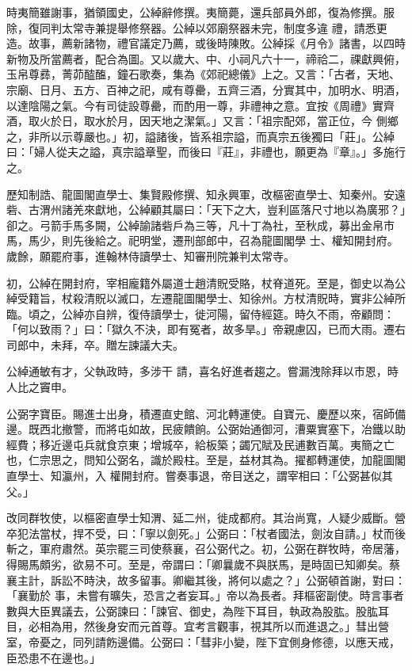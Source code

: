 \begin{pinyinscope}
 時夷簡雖謝事，猶領國史，公綽辭修撰。夷簡薨，還兵部員外郎，復為修撰。服除，復同判太常寺兼提舉修祭器。公綽以郊廟祭器未完，制度多違
 禮，請悉更造。故事，薦新諸物，禮官議定乃薦，或後時陳敗。公綽採《月令》諸書，以四時新物及所當薦者，配合為圖。又以歲大、中、小祠凡六十一，禘祫二，祼獻興俯，玉帛尊彞，菁茆醓醢，鐘石歌奏，集為《郊祀總儀》上之。又言：「古者，天地、宗廟、日月、五方、百神之祀，咸有尊罍，五齊三酒，分實其中，加明水、明酒，以達陰陽之氣。今有司徒設尊罍，而酌用一尊，非禮神之意。宜按《周禮》實齊酒，取火於日，取水於月，因天地之潔氣。」又言：「祖宗配郊，當正位，今
 側鄉之，非所以示尊嚴也。」初，謚諸後，皆系祖宗謚，而真宗五後獨曰「莊」。公綽曰：「婦人從夫之謚，真宗謚章聖，而後曰『莊』，非禮也，願更為『章』。」多施行之。



 歷知制誥、龍圖閣直學士、集賢殿修撰、知永興軍，改樞密直學士、知秦州。安遠砦、古渭州諸羌來獻地，公綽顧其屬曰：「天下之大，豈利區落尺寸地以為廣邪？」卻之。弓箭手馬多闕，公綽諭諸砦戶為三等，凡十丁為社，至秋成，募出金帛市馬，馬少，則先後給之。祀明堂，遷刑部郎中，召為龍圖閣學
 士、權知開封府。歲餘，願罷府事，進翰林侍讀學士、知審刑院兼判太常寺。



 初，公綽在開封府，宰相龐籍外屬道士趙清貺受賂，杖脊道死。至是，御史以為公綽受籍旨，杖殺清貺以滅口，左遷龍圖閣學士、知徐州。方杖清貺時，實非公綽所臨。頃之，公綽亦自辨，復侍讀學士，徙河陽，留侍經筵。時久不雨，帝顧問：「何以致雨？」曰：「獄久不決，即有冤者，故多旱。」帝親慮囚，已而大雨。遷右司郎中，未拜，卒。贈左諫議大夫。



 公綽通敏有才，父執政時，多涉干
 請，喜名好進者趨之。嘗漏洩除拜以市恩，時人比之竇申。



 公弼字寶臣。賜進士出身，積遷直史館、河北轉運使。自寶元、慶歷以來，宿師備邊。既西北撤警，而將屯如故，民疲饋餉。公弼始通御河，漕粟實塞下，冶鐵以助經費；移近邊屯兵就食京東；增城卒，給板築；蠲冗賦及民逋數百萬。夷簡之亡也，仁宗思之，問知公弼名，識於殿柱。至是，益材其為。擢都轉運使，加龍圖閣直學士、知瀛州，入
 權開封府。嘗奏事退，帝目送之，謂宰相曰：「公弼甚似其父。」



 改同群牧使，以樞密直學士知渭、延二州，徙成都府。其治尚寬，人疑少威斷。營卒犯法當杖，捍不受，曰：「寧以劍死。」公弼曰：「杖者國法，劍汝自請。」杖而後斬之，軍府肅然。英宗罷三司使蔡襄，召公弼代之。初，公弼在群牧時，帝居藩，得賜馬頗劣，欲易不可。至是，帝謂曰：「卿曩歲不與朕馬，是時固已知卿矣。蔡襄主計，訴訟不時決，故多留事。卿繼其後，將何以處之？」公弼頓首謝，對曰：「襄勤於
 事，未嘗有曠失，恐言之者妄耳。」帝以為長者。拜樞密副使。時言事者數與大臣異議去，公弼諫曰：「諫官、御史，為陛下耳目，執政為股肱。股肱耳目，必相為用，然後身安而元首尊。宜考言觀事，視其所以而進退之。」彗出營室，帝憂之，同列請飭邊備。公弼曰：「彗非小變，陛下宜側身修德，以應天戒，臣恐患不在邊也。」




\end{pinyinscope}
